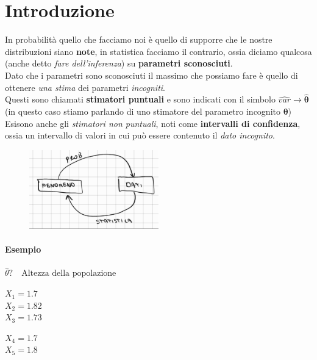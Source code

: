 \documentclass[]{article}
\begin{document}
    \tableofcontents
    \newpage 
    \section{Introduzione}
    In probabilità quello che facciamo noi è quello di supporre che le nostre distribuzioni siano \textbf{note}, in statistica facciamo il contrario, ossia diciamo qualcosa (anche detto \textit{fare dell'inferenza}) su \textbf{parametri sconosciuti}. \\
    Dato che i parametri sono sconosciuti il massimo che possiamo fare è quello di ottenere \textit{una stima} dei parametri \textit{incogniti}. \\[2ex]
    Questi sono chiamati \textbf{stimatori puntuali} e sono indicati con il simbolo $\hat{var} \rightarrow
     \boldsymbol{\hat{\theta}}$ (in questo caso stiamo parlando di uno stimatore del parametro incognito $\boldsymbol{\theta}$) \\[2ex]
    Esisono anche gli \textit{stimatori non puntuali}, noti come \textbf{intervalli di confidenza}, ossia un intervallo di valori in cui può essere contenuto il \textit{dato incognito}.
    \begin{figure}[H]
        \centering
            \includegraphics[width=0.5\textwidth]{images/boh_15.jpg}
    \end{figure}
    \paragraph{Esempio} $\hat{\theta}? \quad \text{Altezza della popolazione}$ \\[2ex]
    \begin{minipage}{0.49\textwidth}
        $X_1 = 1.7$ \\
        $X_2 = 1.82$ \\
        $X_3 = 1.73$
    \end{minipage}
    \begin{minipage}{0.49\textwidth}
        $X_4 = 1.7$ \\
        $X_5 = 1.8$ \\
    \end{minipage}
\end{document}
